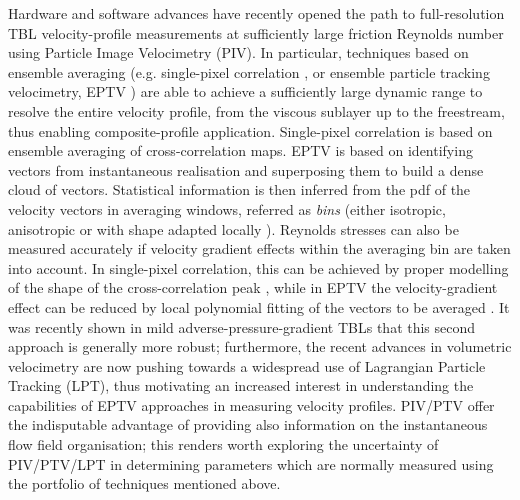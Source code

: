 Hardware and software advances have recently opened the path to full-resolution {TBL velocity-profile} measurements at sufficiently large friction Reynolds number using Particle Image Velocimetry (PIV). In particular, techniques based on ensemble averaging (e.g. single-pixel correlation \citep{westerweel2004single}, or ensemble particle tracking velocimetry, EPTV \citep{cowen1997hybrid,kahler2012uncertainty}) are able to achieve a sufficiently large dynamic range to resolve the entire velocity profile, from the viscous sublayer up to the freestream, thus enabling {composite-profile} application. Single-pixel correlation is based on ensemble averaging of cross-correlation maps. EPTV is based on identifying vectors from instantaneous realisation and superposing them to build a dense cloud of vectors. Statistical information is then inferred from the pdf of the velocity vectors in averaging windows, referred as \textit{bins} (either isotropic, anisotropic or with shape adapted locally \citep{raiola2020adaptive}). 
Reynolds stresses can also be measured accurately if velocity gradient effects within the averaging bin are taken into account. In single-pixel correlation, this can be achieved by proper modelling of the shape of the cross-correlation peak \citep{scharnowski2012reynolds}, while in EPTV the velocity-gradient effect can be reduced by local polynomial fitting of the vectors to be averaged \citep{aguera2016ensemble}. It was recently shown in mild {adverse-pressure-gradient TBLs} \citep{SanmiguelVila2017} that this second approach is generally more robust; furthermore, the recent advances in volumetric velocimetry \citep{discetti2018volumetric} are now pushing towards a widespread use of Lagrangian Particle Tracking (LPT), thus motivating an increased interest in understanding the capabilities of EPTV approaches in measuring velocity profiles. PIV/PTV offer the indisputable advantage of providing also information on the instantaneous flow field organisation; this renders worth exploring the uncertainty of PIV/PTV/LPT in determining parameters which are normally measured using the portfolio of techniques mentioned above.

